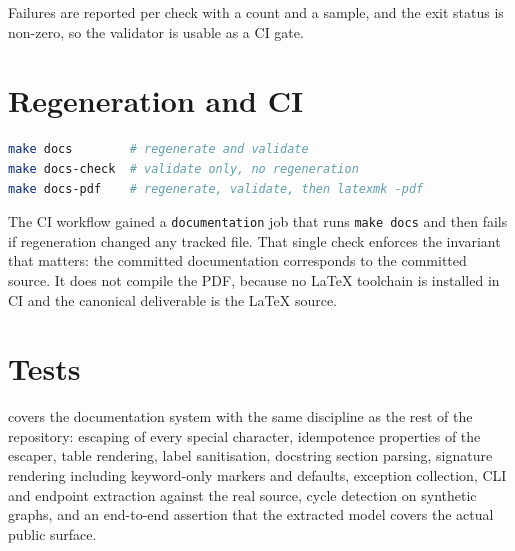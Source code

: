 Failures are reported per check with a count and a sample, and the exit status
is non-zero, so the validator is usable as a CI gate.

\section{Regeneration and CI}

\begin{lstlisting}[language=bash]
make docs        # regenerate and validate
make docs-check  # validate only, no regeneration
make docs-pdf    # regenerate, validate, then latexmk -pdf
\end{lstlisting}

The CI workflow gained a \texttt{documentation} job that runs
\texttt{make docs} and then fails if regeneration changed any tracked file.
That single check enforces the invariant that matters: the committed
documentation corresponds to the committed source. It does not compile the PDF,
because no LaTeX toolchain is installed in CI and the canonical deliverable is
the LaTeX source.

\section{Tests}

 covers the documentation system with the
same discipline as the rest of the repository: escaping of every special
character, idempotence properties of the escaper, table rendering, label
sanitisation, docstring section parsing, signature rendering including
keyword-only markers and defaults, exception collection, CLI and endpoint
extraction against the real source, cycle detection on synthetic graphs, and an
end-to-end assertion that the extracted model covers the actual public surface.
